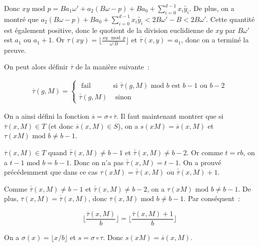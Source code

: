          Donc $xy \text{\ mod } p = B a_1\omega' + a_2(B\omega - p) + B a_0 + \sum_{i=0}^{d-1} x_i \tilde{y_i}$. De plus, on a montré que $a_2(B\omega - p) + B a_0 + \sum_{i=0}^{d-1} x_i \tilde{y_i} < 2B\omega' - B < 2B\omega'$. Cette quantité est également positive, donc le quotient de la division euclidienne de $xy$ par $B\omega'$ est $a_1$ ou $a_1 + 1$. Or $\tau(xy) = \lfloor \frac{xy\mod p}{\omega' B} \rfloor$ et $\overline{\overline{\tau}}(x,y) = a_1$, donc on a terminé la preuve.
         
         On peut alors définir $\overline{\tau}$ de la manière suivante~:
         
         \begin{align*}
          \overline{\tau}(g,M) =
          \begin{cases}
            \text{\ fail } & \text{si } \overline{\overline{\tau}}(g,M) \text{\ mod $b$ est $b - 1$ ou $b - 2$} \\
            \overline{\overline{\tau}}(g,M)  & \text{ sinon}
          \end{cases}
          \end{align*}
          
          On a ainsi défini la fonction $\overline{s} = \sigma \circ \overline{\tau}$.  Il faut maintenant montrer que si $\overline{\tau}(x,M) \in T$ (et donc $\overline{s}(x,M) \in S$), on a $s(xM)=\overline{s}(x,M)$ et $\tau(xM) \text{\ mod } b \neq b - 1$.
          
          $\overline{\tau}(x,M) \in T$ quand $\overline{\overline{\tau}}(x,M) \neq b - 1$ et $\overline{\overline{\tau}}(x,M) \neq b - 2$. Or comme $t = rb$, on a $t - 1 \text{\ mod } b = b - 1$. Donc on n'a pas $\overline{\overline{\tau}}(x,M) = t - 1$. On a prouvé précédemment que dans ce cas $\tau(xM) = \overline{\overline{\tau}}(x,M)$ ou $\overline{\overline{\tau}}(x,M) + 1$.
          
          Comme $\overline{\overline{\tau}}(x,M) \neq b - 1$ et $\overline{\overline{\tau}}(x,M) \neq b - 2$, on a $\tau(xM) \text{\ mod } b \neq b - 1$. De plus, $\overline{\tau}(x,M) = \overline{\overline{\tau}}(x,M)$, donc $\overline{\tau}(x,M) \text{\ mod } b \neq b - 1$. Par conséquent~:
          
          $$\lfloor \frac{\overline{\tau}(x,M)}{b} \rfloor = \lfloor \frac{\overline{\tau}(x,M) + 1}{b} \rfloor$$
          
          On a $\sigma(x) = \lfloor x/b \rfloor$ et $s= \sigma \circ \tau$. Donc $s(xM) = \overline{s}(x,M)$.